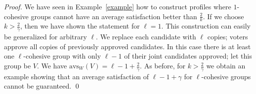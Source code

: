 \documentclass[envcountsame]{llncs}
\newcommand{\aver}[1]{{{\mathrm{avs}_{#1}}}}
\begin{document}
\begin{proof}
We have seen in Example~\ref{example} how to construct profiles where $1$-cohesive groups 
cannot have an average satisfaction better than $\frac{2}{k}$. 
If we choose $k>\frac 2 \gamma$, then we have shown the statement for $\ell=1$.
This construction can easily be generalized for arbitrary $\ell$. 
We replace each candidate with $\ell$ copies; voters approve all copies of previously approved candidates. 
In this case there is at least one $\ell$-cohesive group with only $\ell-1$ 
of their joint candidates approved; let this group be $V$. 
We have $\aver{W}(V)=\ell-1+\frac 2 \gamma$. As before, for $k>\frac 2 \gamma$ 
we obtain an example showing that an average satisfaction of $\ell-1+\gamma$ 
for $\ell$-cohesive groups cannot be guaranteed.
\qed\end{proof}




\end{document}
